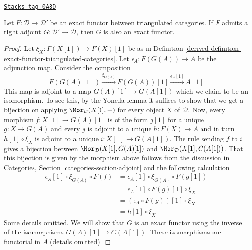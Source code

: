 \begin{lemma}
\label{derived-lemma-adjoint-is-exact}
\href{https://stacks.math.columbia.edu/tag/0A8D}{\texttt{Stacks tag 0A8D}}

Let $F : \mathcal{D} \to \mathcal{D}'$ be an exact functor between
triangulated categories. If $F$ admits a right adjoint
$G: \mathcal{D'} \to \mathcal{D}$, then $G$ is also an exact functor.
\end{lemma}

\begin{proof}

Let $\xi_X : F(X[1]) \to F(X)[1]$ be as in
Definition \ref{derived-definition-exact-functor-triangulated-categories}.
Let $\epsilon_A : F(G(A)) \to A$ be the adjunction map.
Consider the composition
$$
F(G(A)[1]) \xrightarrow{\xi_{G(A)}} F(G(A))[1] \xrightarrow{\epsilon_A[1]} A[1]
$$
This map is adjoint to a map $G(A)[1] \to G(A[1])$ which we claim to
be an isomorphism. To see this, by the Yoneda lemma it suffices to
show that we get a bijection on applying $\Mor_\mathcal{D}(X[1], -)$
for every object $X$ of $\mathcal{D}$.
Now, every morphism $f : X[1] \to G(A)[1]$ is of the form $g[1]$ for a unique
$g : X \to G(A)$ and every $g$ is adjoint to a unique
$h : F(X) \to A$ and in turn $h[1] \circ \xi_X$ is adjoint to a unique
$i : X[1] \to G(A[1])$. The rule sending $f$ to $i$ gives a bijection between
$\Mor_\mathcal{D}(X[1], G(A)[1])$ and $\Mor_\mathcal{D}(X[1], G(A[1]))$.
That this bijection is given by the morphism above follows from
the discussion in Categories, Section \ref{categories-section-adjoint}
and the following calculation
\begin{align*}
\epsilon_A[1] \circ \xi_{G(A)} \circ F(f)
& =
\epsilon_A[1] \circ \xi_{G(A)} \circ F(g[1]) \\
& =
\epsilon_A[1] \circ F(g)[1] \circ \xi_X \\
& =
(\epsilon_A \circ F(g))[1] \circ \xi_X \\
& =
h[1] \circ \xi_X
\end{align*}
Some details omitted. We will show that $G$ is an exact functor using the
inverse of the isomorphisms $G(A)[1] \to G(A[1])$. These isomorphisms
are functorial in $A$ (details omitted).


\end{proof}
